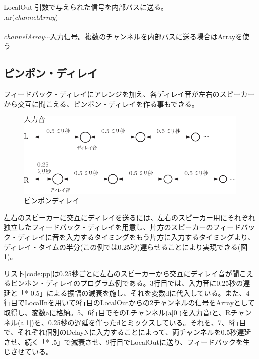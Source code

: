 \documentclass{jsarticle}
\begin{document}
\begin{itembox}[l]{LocalOut}
	{\footnotesize 
	引数で与えられた信号を内部バスに送る。\\
	.ar({\it channelArray})\\\\
	{\it channelArray}$\cdots$入力信号。複数のチャンネルを内部バスに送る場合はArrayを使う\\
	}
\end{itembox}

\subsection{ピンポン・ディレイ}
フィードバック・ディレイにアレンジを加え、各ディレイ音が左右のスピーカーから交互に聞こえる、ピンポン・ディレイを作る事もできる。

\begin{figure}[htbp]
	\begin{center}
		\includegraphics[scale=0.65]{pingpong.pdf}
	\end{center}
	\caption{ピンポンディレイ}
	\label{fig:pingpong}
\end{figure}

左右のスピーカーに交互にディレイを送るには、左右のスピーカー用にそれぞれ独立したフィードバック・ディレイを用意し、片方のスピーカーのフィードバック・ディレイに音を入力するタイミングをもう片方に入力するタイミングより、ディレイ・タイムの半分(この例では0.25秒)遅らせることにより実現できる(図\ref{fig:pingpong})。

リスト\ref{code:pp}は0.25秒ごとに左右のスピーカーから交互にディレイ音が聞こえるピンポン・ディレイのプログラム例である。3行目では、入力音に0.25秒の遅延と「* 0.5」による振幅の減衰を施し、それを変数dに代入している。また、4行目でLocalInを用いて9行目のLocalOutからの2チャンネルの信号をArrayとして取得し、変数aに格納。5、6行目でそのLチャンネル(a[0])を入力音iと、Rチャンネル(a[1])を、0.25秒の遅延を伴ったdとミックスしている。それを、7、8行目で、それぞれ個別のDelayNに入力することによって、両チャンネルを0.5秒遅延させ、続く「* .5」で減衰させ、9行目でLocalOutに送り、フィードバックを生じさせている。
\end{document}
